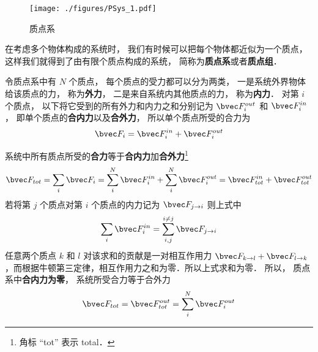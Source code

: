
\begin{figure}[ht]
\centering
\texttt{[image: ./figures/PSys\_1.pdf]}
\caption{质点系} \label{PSys_fig1}
\end{figure}

在考虑多个物体构成的系统时， 我们有时候可以把每个物体都近似为一个质点， 这样我们就得到了由有限个质点构成的系统， 简称为\textbf{质点系}或者\textbf{质点组}．

令质点系中有 $N$ 个质点， 每个质点的受力都可以分为两类， 一是系统外界物体给该质点的力， 称为\textbf{外力}， 二是来自系统内其他质点的力， 称为\textbf{内力}． 对第 $i$ 个质点， 以下将它受到的所有外力和内力之和分别记为 $\bvec F_i^{out}$ 和 $\bvec F_i^{in}$， 即单个质点的\textbf{合内力}以及\textbf{合外力}， 所以单个质点所受的合力为
\begin{equation}
\bvec F_i = \bvec F_i^{in} + \bvec F_i^{out}
\end{equation}

系统中所有质点所受的\textbf{合力}等于\textbf{合内力}加\textbf{合外力}\footnote{角标 “tot” 表示 total．}
\begin{equation}
\bvec F_{tot} = \sum_i \bvec F_i = \sum_i^N \bvec F_i^{in} + \sum_i^N \bvec F_i^{out} = \bvec F_{tot}^{in} + \bvec F_{tot}^{out}
\end{equation}
若将第 $j$ 个质点对第 $i$ 个质点的内力记为 $\bvec F_{j\to i}$ 则上式中
\begin{equation}
\sum_i \bvec F_i^{in} = \sum_{i,j}^{i \ne j} \bvec F_{j \to i}
\end{equation}
任意两个质点 $k$ 和 $l$ 对该求和的贡献是一对相互作用力 $\bvec F_{k \to l} + \bvec F_{l \to k}$，而根据牛顿第三定律，相互作用力之和为零．所以上式求和为零． 所以， 质点系中\textbf{合内力为零}， 系统所受合力等于合外力
\begin{equation}
\bvec F_{tot} = \bvec F_{tot}^{out} = \sum_i^N \bvec F_i^{out}
\end{equation}
